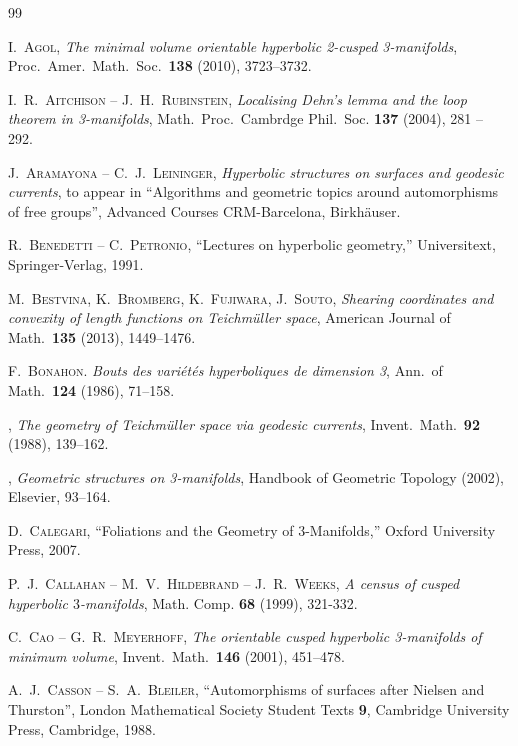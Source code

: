 \begin{thebibliography}{99}

 \textsc{I.~Agol}, \emph{The minimal volume orientable hyperbolic 2-cusped 3-manifolds}, Proc.~Amer.~Math.~Soc.~\textbf{138} (2010), 3723--3732.

 \textsc{I.~R.~Aitchison -- J.~H.~Rubinstein}, 
\emph{Localising Dehn's lemma and the loop theorem in 3-manifolds}, 
Math.~Proc.~Cambrdge Phil.~Soc. \textbf{137} (2004), 281 -- 292.

 \textsc{J.~Aramayona -- C.~J.~Leininger}, \emph{Hyperbolic structures on surfaces and geodesic currents}, to appear in ``Algorithms and geometric topics around automorphisms of free groups'', Advanced Courses CRM-Barcelona, Birkh\"auser.

 \textsc{R.~Benedetti -- C.~Petronio}, ``Lectures on hyperbolic geometry,'' Universitext, Springer-Verlag, 1991.

 \textsc{M.~Bestvina, K.~Bromberg, K.~Fujiwara, J.~Souto}, \emph{Shearing coordinates and convexity of length functions on Teichm\"uller space}, American Journal of Math.~\textbf{135} (2013), 1449--1476.

 \textsc{F.~Bonahon}. \emph{Bouts des vari\'et\'es hyperboliques de dimension 3}, Ann.~of Math.~\textbf{124} (1986), 71--158.

 \bysame, \emph{The geometry of Teichm\"uller space via geodesic currents}, Invent.~Math.~\textbf{92} (1988), 139--162.

 \bysame, \emph{Geometric structures on 3-manifolds}, Handbook of Geometric Topology (2002), Elsevier, 93--164.

 \textsc{D.~Calegari}, ``Foliations and the Geometry of 3-Manifolds,'' Oxford University Press, 2007.

 \textsc{P.~J.~Callahan -- M.~V.~Hildebrand --
    J.~R.~Weeks}, \emph{A census of cusped hyperbolic $3$-manifolds},
  Math. Comp. \textbf{68} (1999), 321-332.

 \textsc{C.~Cao -- G.~R.~Meyerhoff}, \emph{The orientable cusped hyperbolic 3-manifolds of minimum volume}, Invent.~Math.~\textbf{146} (2001), 451--478.

 \textsc{A.~J.~Casson -- S.~A.~Bleiler}, ``Automorphisms of surfaces after Nielsen and Thurston'', London Mathematical Society Student Texts \textbf{9}, Cambridge University Press, Cambridge, 1988.


\end{thebibliography}

